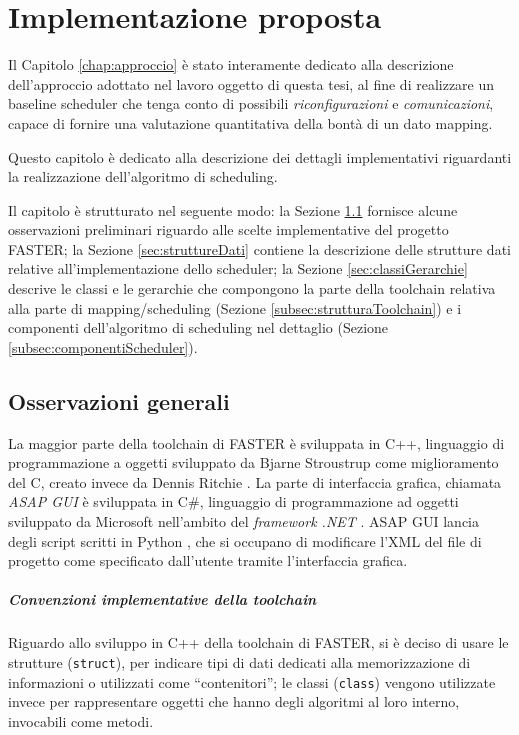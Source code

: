 \chapter{Implementazione proposta}
\label{chap:implementazione}
\vspace{1cm}
Il Capitolo \ref{chap:approccio} è stato interamente dedicato alla descrizione 
dell'approccio adottato nel lavoro oggetto di questa tesi, al fine di 
realizzare un baseline scheduler che tenga conto di possibili 
\emph{riconfigurazioni} e \emph{comunicazioni}, capace di fornire una 
valutazione quantitativa della bontà di un dato mapping.

Questo capitolo è dedicato alla descrizione dei dettagli implementativi 
riguardanti la realizzazione dell'algoritmo di scheduling.

Il capitolo è strutturato nel seguente modo: la Sezione 
\ref{sec:osservazioniGenerali} fornisce alcune osservazioni preliminari 
riguardo alle scelte implementative del progetto \ac{FASTER}; la Sezione 
\ref{sec:struttureDati} contiene la descrizione delle strutture dati relative 
all'implementazione dello scheduler; la Sezione \ref{sec:classiGerarchie} 
descrive le classi e le gerarchie che compongono la parte della toolchain 
relativa alla parte di mapping/scheduling (Sezione 
\ref{subsec:strutturaToolchain}) e i componenti dell'algoritmo di scheduling nel 
dettaglio (Sezione \ref{subsec:componentiScheduler}).


\section{Osservazioni generali}
\label{sec:osservazioniGenerali}
La maggior parte della toolchain di \ac{FASTER} è sviluppata in C++, 
linguaggio di programmazione a oggetti sviluppato da Bjarne Stroustrup 
\cite{CppStroustrup} come miglioramento del C, creato invece da Dennis Ritchie 
\cite{CKernighanRitchie}. La parte di interfaccia grafica, chiamata \emph{ASAP 
GUI} è sviluppata in C\#, linguaggio di programmazione ad oggetti sviluppato da 
Microsoft nell'ambito del \emph{framework .NET} \cite{ProCSharp}. ASAP GUI 
lancia degli script scritti in Python \cite{ThinkPython}, che si occupano di 
modificare l'XML del file di progetto come specificato dall'utente tramite 
l'interfaccia grafica.
\paragraph{Convenzioni implementative della toolchain}
Riguardo allo sviluppo in C++ della toolchain di \ac{FASTER}, si è deciso di 
usare le strutture (\verb+struct+), per indicare tipi di dati dedicati alla 
memorizzazione di informazioni o utilizzati come ``contenitori''; le classi 
(\verb+class+) vengono utilizzate invece per rappresentare oggetti che hanno 
degli algoritmi al loro interno, invocabili come metodi.

